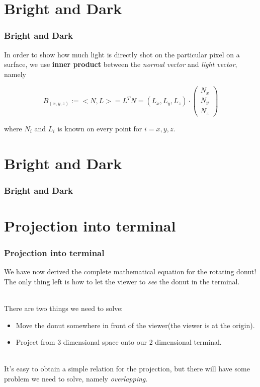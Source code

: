 \documentclass[12pt, t]{beamer}
\renewcommand{\emph}[1]{{\color{Turquoise3}\textsl{#1}}}
\newcommand{\nullspace}{~\\[15pt]}
\begin{document}
\section{Bright and Dark}
\begin{frame}
    \frametitle{Bright and Dark}

    In order to show how much light is directly shot on the particular pixel on a
    surface, we use \textbf{inner product} between the \emph{normal vector} and \emph{light vector},
    namely

    \begin{equation*}
        B_{(x,y,z)} := <N,L> =L^T N = 
        (L_x,L_y,L_z)
        \cdot
        \begin{pmatrix}
            N_x \\
            N_y \\
            N_z
        \end{pmatrix}
    \end{equation*}

    where $N_i$ and $L_i$ is known on every point for $i = x,y,z$.

\end{frame}



\section{Bright and Dark}
\begin{frame}
    \frametitle{Bright and Dark}


\end{frame}


\section{Projection into terminal}
\begin{frame}
    \frametitle{Projection into terminal}

    We have now derived the complete mathematical equation for the rotating donut! The 
    only thing left is how to let the viewer to \emph{see} the donut in the terminal.

    \nullspace
    There are two things we need to solve:
    \begin{itemize}
        \item Move the donut somewhere in front of the viewer(the viewer is at the origin).
        \item Project from 3 dimensional space onto our 2 dimensional terminal.
    \end{itemize}

    \nullspace
    It's easy to obtain a simple relation for the projection, but there will have some problem 
    we need to solve, namely \emph{overlapping}.

\end{frame}
\end{document}
